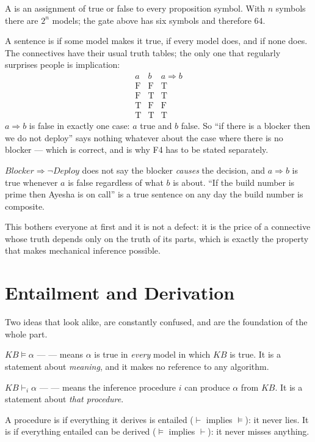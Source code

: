 \begin{definitionbox}
A  is an assignment of true or false to every proposition symbol. With
$n$ symbols there are $2^{n}$ models; the gate above has six symbols and therefore
$64$.

A sentence is  if some model makes it true,  if every
model does, and  if none does. The connectives have their usual
truth tables; the only one that regularly surprises people is implication:
\[
  \begin{array}{cc|c}
    a & b & a \Rightarrow b \\ \hline
    \text{F} & \text{F} & \text{T} \\
    \text{F} & \text{T} & \text{T} \\
    \text{T} & \text{F} & \text{F} \\
    \text{T} & \text{T} & \text{T}
  \end{array}
\]
$a \Rightarrow b$ is false in exactly one case: $a$ true and $b$ false. So
``if there is a blocker then we do not deploy'' says nothing whatever about the case
where there is no blocker --- which is correct, and is why F4 has to be stated
separately.
\end{definitionbox}

\begin{alertbox}
$\mathit{Blocker} \Rightarrow \neg \mathit{Deploy}$ does not say the blocker
\emph{causes} the decision, and $a \Rightarrow b$ is true whenever $a$ is false
regardless of what $b$ is about. ``If the build number is prime then Ayesha is on
call'' is a true sentence on any day the build number is composite.

This bothers everyone at first and it is not a defect: it is the price of a
connective whose truth depends only on the truth of its parts, which is exactly the
property that makes mechanical inference possible.
\end{alertbox}

\section{Entailment and Derivation}

Two ideas that look alike, are constantly confused, and are the foundation of the
whole part.

\begin{definitionbox}
$\mathit{KB} \models \alpha$ ---  --- means $\alpha$ is true in
\emph{every} model in which $\mathit{KB}$ is true. It is a statement about
\emph{meaning}, and it makes no reference to any algorithm.

$\mathit{KB} \vdash_{i} \alpha$ ---  --- means the inference
procedure $i$ can produce $\alpha$ from $\mathit{KB}$. It is a statement about
\emph{that procedure}.

A procedure is  if everything it derives is entailed
($\vdash$ implies $\models$): it never lies. It is  if everything
entailed can be derived ($\models$ implies $\vdash$): it never misses anything.
\end{definitionbox}

